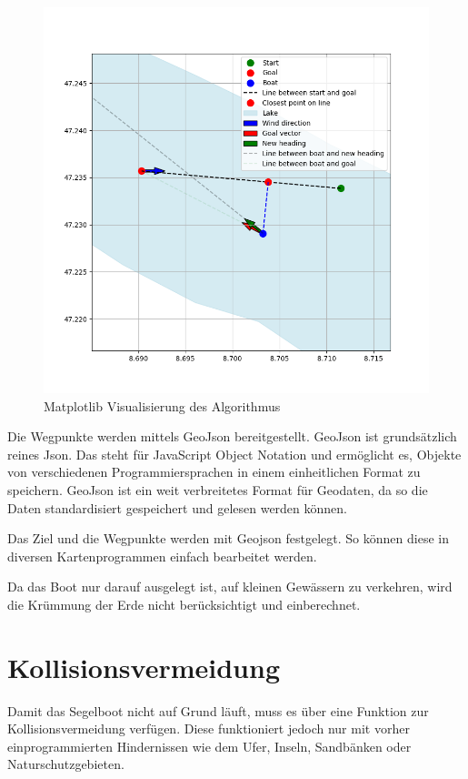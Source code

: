 \begin{figure}[H]
    \centering
    \includegraphics[width=1\linewidth]{assets/3.png}
    \caption{Matplotlib Visualisierung des Algorithmus}
    
\end{figure}

Die Wegpunkte werden mittels GeoJson bereitgestellt. GeoJson ist grundsätzlich reines Json. Das steht für JavaScript Object Notation und ermöglicht es, Objekte von verschiedenen Programmiersprachen in einem einheitlichen Format zu speichern. GeoJson ist ein weit verbreitetes Format für Geodaten, da so die Daten standardisiert gespeichert und gelesen werden können.

Das Ziel und die Wegpunkte werden mit Geojson festgelegt. So können diese in diversen Kartenprogrammen einfach bearbeitet werden.

Da das Boot nur darauf ausgelegt ist, auf kleinen Gewässern zu verkehren, wird die Krümmung der Erde nicht berücksichtigt und einberechnet.
\section{Kollisionsvermeidung}
Damit das Segelboot nicht auf Grund läuft, muss es über eine Funktion zur Kollisionsvermeidung verfügen. Diese funktioniert jedoch nur mit vorher einprogrammierten Hindernissen wie dem Ufer, Inseln, Sandbänken oder Naturschutzgebieten. 


